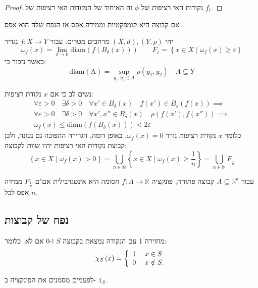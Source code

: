 \documentclass{tstextbook}
\begin{document}
\begin{proof}
נקודות האי רציפות של \(\phi\) זה האיחוד של הנקודות האי רציפות של \(f_{i}\).

\end{proof}
\begin{proposition}
אם קבוצה היא קומפקטיות וממידה אפס אז הנפח שלה הוא אפס

\end{proposition}
\begin{definition}
יהי \((X,d),\left( Y,\rho \right)\) מרחבים מטרים. עבור \(f:X\to Y\) נגדיר 
$$\omega_{f}(x)=\lim_{ \delta \to 0 } \mathrm{diam}\left( f\left( B_{\delta}(x) \right) \right)\qquad F_{\varepsilon}=\left\{ x \in X \mid 
\omega_{f}(x)\geq \varepsilon  \right\}$$
כאשר נזכור כי:
$$\mathrm{diam(A)}=\sup_{y_{1},y_{2}\in A} \rho\left(y_{1},y_{2} \right)\quad A\subseteq Y$$

\end{definition}
נשים לב כי אם \(x\) נקודת רציפות:
$$\begin{gather} \forall \varepsilon >0 \quad \exists \delta>0\quad \forall x'\in B_{\delta}(x)\quad f(x')\in B_{\varepsilon}(f(x))\implies  \\\forall\varepsilon>0 \quad \exists \delta>0\quad \forall x',x''\in B_{\delta}(x)\quad \rho(f(x'),f(x''))\implies \\
\omega_{f}(x)\leq \mathrm{diam}\left( f\left( B_{\delta}(x) \right) \right)<2\varepsilon\end{gather}$$
כלומר \(x\) נקודת רציפות גורר \(\omega_{f}(x)=0\). באופן דומה, הגרירה ההפוכה גם נכונה, ולכן קבוצת נקודות האי רציפות יהיו שוות לקבוצה:
$$\left\{  x \in X \mid \omega_{f}(x)>0  \right\}=\bigcup_{n\in\mathbb{N}}\left\{  x \in X \mid \omega_{f}(x)\geq \frac{1}{n}  \right\}=\bigcup_{n \in \mathbb{N}}F_{\frac{1}{n}}$$

\begin{proposition}
עבור \(A\subseteq \mathbb{R}^k\) קבוצה פתוחה, פונקציה \(f:A\to\mathbb{R}\) חסומה היא אינטגרבילית אם"ם \(F_{\frac{1}{n}}\) ממידה אפס לכל \(n\).

\end{proposition}
\subsection{נפח של קבוצות}

\begin{definition}
מחזירה 1 עם הנקודה נמצאת בקבוצה \(S\) ו-0 אם לא. כלומר:
$$\chi_{S}\left(x\right)=\left\{{\begin{array}{l l}{1}&{\;x\in S}\\ {0}&{\;x\notin S.}\end{array}}\right.$$

\end{definition}
לפעמים מסמנים את הפונקציה ב- \(1_{S}\). 
\end{document}
